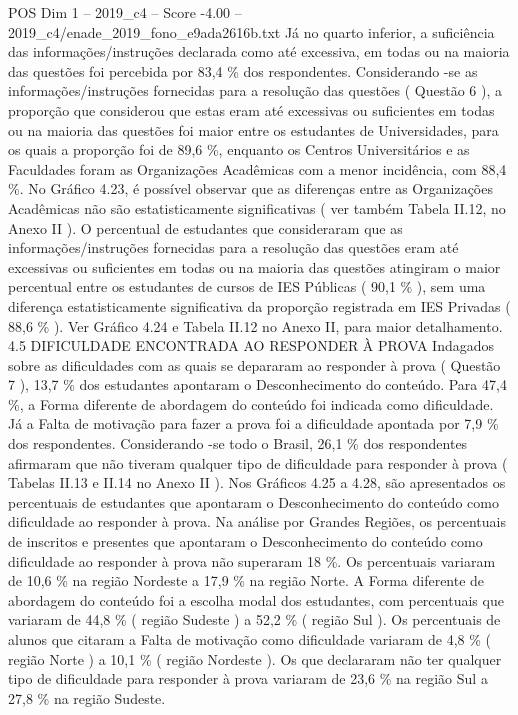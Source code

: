 \begin{textsample}{POS Dim 1 – 2019\_c4 – Score -4.00 – 2019\_c4/enade\_2019\_fono\_e9ada2616b.txt}
Já no quarto inferior, a suficiência das informações/instruções declarada como até excessiva, em todas ou na maioria das questões foi percebida por 83,4 \% dos respondentes.
Considerando -se as informações/instruções fornecidas para a resolução das questões ( Questão 6 ), a proporção que considerou que estas eram até excessivas ou suficientes em todas ou na maioria das questões foi maior entre os estudantes de Universidades, para os quais a proporção foi de 89,6 \%, enquanto os Centros Universitários e as Faculdades foram as Organizações Acadêmicas com a menor incidência, com 88,4 \%.
No Gráfico 4.23, é possível observar que as diferenças entre as Organizações Acadêmicas não são estatisticamente significativas ( ver também Tabela II.12, no Anexo II ).
O percentual de estudantes que consideraram que as informações/instruções fornecidas para a resolução das questões eram até excessivas ou suficientes em todas ou na maioria das questões atingiram o maior percentual entre os estudantes de cursos de IES Públicas ( 90,1 \% ), sem uma diferença estatisticamente significativa da proporção registrada em IES Privadas ( 88,6 \% ).
Ver Gráfico 4.24 e Tabela II.12 no Anexo II, para maior detalhamento. 4.5 DIFICULDADE ENCONTRADA AO RESPONDER À PROVA Indagados sobre as dificuldades com as quais se depararam ao responder à prova ( Questão 7 ), 13,7 \% dos estudantes apontaram o Desconhecimento do conteúdo.
Para 47,4 \%, a Forma diferente de abordagem do conteúdo foi indicada como dificuldade.
Já a Falta de motivação para fazer a prova foi a dificuldade apontada por 7,9 \% dos respondentes.
Considerando -se todo o Brasil, 26,1 \% dos respondentes afirmaram que não tiveram qualquer tipo de dificuldade para responder à prova ( Tabelas II.13 e II.14 no Anexo II ).
Nos Gráficos 4.25 a 4.28, são apresentados os percentuais de estudantes que apontaram o Desconhecimento do conteúdo como dificuldade ao responder à prova.
Na análise por Grandes Regiões, os percentuais de inscritos e presentes que apontaram o Desconhecimento do conteúdo como dificuldade ao responder à prova não superaram 18 \%.
Os percentuais variaram de 10,6 \% na região Nordeste a 17,9 \% na região Norte.
A Forma diferente de abordagem do conteúdo foi a escolha modal dos estudantes, com percentuais que variaram de 44,8 \% ( região Sudeste ) a 52,2 \% ( região Sul ).
Os percentuais de alunos que citaram a Falta de motivação como dificuldade variaram de 4,8 \% ( região Norte ) a 10,1 \% ( região Nordeste ).
Os que declararam não ter qualquer tipo de dificuldade para responder à prova variaram de 23,6 \% na região Sul a 27,8 \% na região Sudeste.

\end{textsample}
